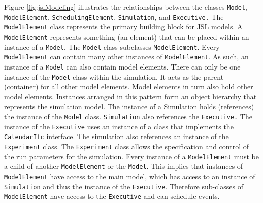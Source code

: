 \documentclass[
]{book}
\theoremstyle{definition}
\theoremstyle{definition}
\theoremstyle{definition}
\theoremstyle{definition}
\theoremstyle{remark}
\begin{document}
Figure \ref{fig:jslModeling} illustrates the relationships between the
classes \texttt{Model}, \texttt{ModelElement}, \texttt{SchedulingElement}, \texttt{Simulation}, and
\texttt{Executive.} The \texttt{ModelElement} class represents the primary building block
for JSL models. A \texttt{ModelElement} represents something (an element) that
can be placed within an instance of a \texttt{Model}. The \texttt{Model} class subclasses
\texttt{ModelElement}. Every \texttt{ModelElement} can contain many other instances of
\texttt{ModelElement}. As such, an instance of a \texttt{Model} can also contain model
elements. There can only be one instance of the \texttt{Model} class within the
simulation. It acts as the parent (container) for all other model
elements. Model elements in turn also hold other model elements.
Instances arranged in this pattern form an object hierarchy that
represents the simulation model. The instance of a Simulation holds
(references) the instance of the \texttt{Model} class. \texttt{Simulation} also references
the \texttt{Executive.} The instance of the \texttt{Executive} uses an instance of a class
that implements the \texttt{CalendarIfc} interface. The simulation also
references an instance of the \texttt{Experiment} class. The \texttt{Experiment} class
allows the specification and control of the run parameters for the
simulation. Every instance of a \texttt{ModelElement} must be a child of another
\texttt{ModelElement} or the \texttt{Model}. This implies that instances of \texttt{ModelElement}
have access to the main model, which has access to an instance of
\texttt{Simulation} and thus the instance of the \texttt{Executive}. Therefore sub-classes
of \texttt{ModelElement} have access to the \texttt{Executive} and can schedule events.
\end{document}
